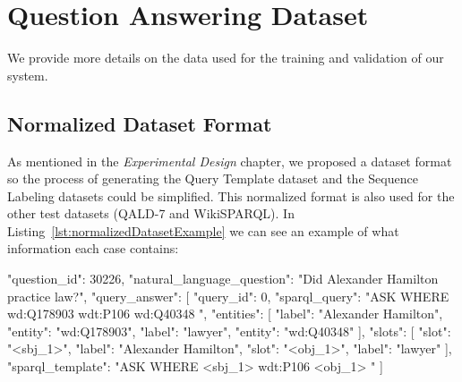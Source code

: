 \chapter{Question Answering Dataset}
\label{appendix:qaDataset}
We provide more details on the data used for the training and validation of our system.

\section{Normalized Dataset Format}
\label{appendix:qaDataset/normalizedFormat}
As mentioned in the \textit{Experimental Design} chapter, we proposed a dataset format so the process 
of generating the Query Template dataset and the Sequence Labeling datasets could be simplified. This 
normalized format is also used for the other test datasets (QALD-7 and WikiSPARQL). In 
Listing~\ref{lst:normalizedDatasetExample} we can see an example of what information each case contains:

\begin{sparqlcode}[%
    caption={Example of one \LCQuADtwo{} case following our proposed normalized format.}, 
    label={lst:normalizedDatasetExample}]
    "question_id": 30226,
    "natural_language_question": "Did Alexander Hamilton practice law?",
    "query_answer": [
        {
            "query_id": 0,
            "sparql_query": 
                "ASK WHERE { wd:Q178903 wdt:P106 wd:Q40348 }",
            "entities": [ 
                {"label": "Alexander Hamilton", "entity": "wd:Q178903"},
                {"label": "lawyer", "entity": "wd:Q40348"}
            ],
            "slots": [
                {"slot": "<sbj_1>", "label": "Alexander Hamilton"},
                {"slot": "<obj_1>", "label": "lawyer"}
            ],
            "sparql_template": "ASK WHERE { <sbj_1> wdt:P106 <obj_1> }"
        }
    ]
\end{sparqlcode}

